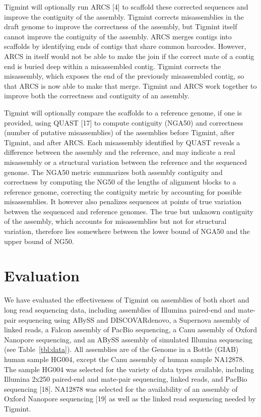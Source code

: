 \documentclass{bmcart}
\begin{document}
Tigmint will optionally run ARCS {[}4{]} to scaffold these corrected sequences and improve the contiguity of the assembly. Tigmint corrects misassemblies in the draft genome to improve the correctness of the assembly, but Tigmint itself cannot improve the contiguity of the assembly. ARCS merges contigs into scaffolds by identifying ends of contigs that share common barcodes. However, ARCS in itself would not be able to make the join if the correct mate of a contig end is buried deep within a misassembled contig. Tigmint corrects the misassembly, which exposes the end of the previously misassembled contig, so that ARCS is now able to make that merge. Tigmint and ARCS work together to improve both the correctness and contiguity of an assembly.

Tigmint will optionally compare the scaffolds to a reference genome, if one is provided, using QUAST {[}17{]} to compute contiguity (NGA50) and correctness (number of putative misassemblies) of the assemblies before Tigmint, after Tigmint, and after ARCS. Each misassembly identified by QUAST reveals a difference between the assembly and the reference, and may indicate a real misassembly or a structural variation between the reference and the sequenced genome. The NGA50 metric summarizes both assembly contiguity and correctness by computing the NG50 of the lengths of alignment blocks to a reference genome, correcting the contiguity metric by accounting for possible misassemblies. It however also penalizes sequences at points of true variation between the sequenced and reference genomes. The true but unknown contiguity of the assembly, which accounts for misassemblies but not for structural variation, therefore lies somewhere between the lower bound of NGA50 and the upper bound of NG50.

\hypertarget{evaluation}{%
\section*{Evaluation}\label{evaluation}}

We have evaluated the effectiveness of Tigmint on assemblies of both short and long read sequencing data, including assemblies of Illumina paired-end and mate-pair sequencing using ABySS and DISCOVARdenovo, a Supernova assembly of linked reads, a Falcon assembly of PacBio sequencing, a Canu assembly of Oxford Nanopore sequencing, and an ABySS assembly of simulated Illumina sequencing (see Table~\ref{tbl:data}). All assemblies are of the Genome in a Bottle (GIAB) human sample HG004, except the Canu assembly of human sample NA12878. The sample HG004 was selected for the variety of data types available, including Illumina 2x250 paired-end and mate-pair sequencing, linked reads, and PacBio sequencing {[}18{]}. NA12878 was selected for the availability of an assembly of Oxford Nanopore sequencing {[}19{]} as well as the linked read sequencing needed by Tigmint.
\end{document}
